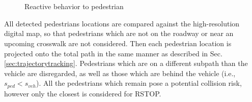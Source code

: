 \documentclass[letterpaper, 10 pt, conference]{ieeeconf}  %
\begin{document}
\begin{figure}[thpb]
\centering
  \\
  \\
  \caption{Reactive behavior to pedestrian}
  \label{fig:react}
\end{figure}

All detected pedestrians locations are compared against the high-resolution digital map, so that pedestrians which are not on the roadway or near an upcoming crosswalk are not considered.
Then each pedestrian location is projected onto the total path in the same manner as described in Sec. \ref{sec:trajectorytracking}.
Pedestrians which are on a different subpath than the vehicle are disregarded, as well as those which are behind the vehicle (i.e., $s_{ped} < s_{veh}$).
All the pedestrians which remain pose a potential collision risk, however only the closest is considered for RSTOP.
\end{document}

